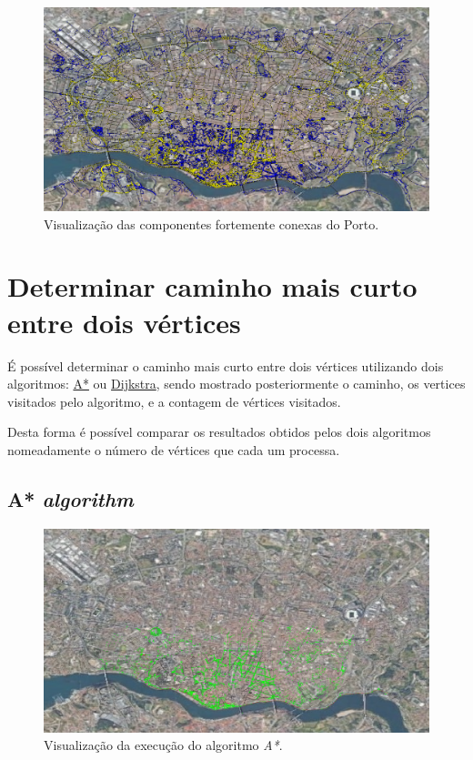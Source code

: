 \documentclass[12pt,a4paper]{report}
\begin{document}
\begin{figure}[H]
	\includegraphics[width=1.0\textwidth]{./imgs/funcs/scc.png}
	\centering
	\caption{Visualização das componentes fortemente conexas do Porto.}
\end{figure}


\section{Determinar caminho mais curto entre dois vértices}
É possível determinar o caminho mais curto entre dois vértices utilizando dois algoritmos: \hyperref[algo:astar]{A*} ou \hyperref[algo:dijkstra]{Dijkstra},
sendo mostrado posteriormente o caminho, os vertices visitados pelo algoritmo, e a contagem de vértices visitados. \par
Desta forma é possível comparar os resultados obtidos pelos dois algoritmos nomeadamente o número de vértices que cada um processa.


\subsection{A* \textit{algorithm}}

\begin{figure}[H]
	\includegraphics[width=1.0\textwidth]{./imgs/funcs/astar.png}
	\centering
	\caption{Visualização da execução do algoritmo \textit{A*}.}
\end{figure}
\end{document}
